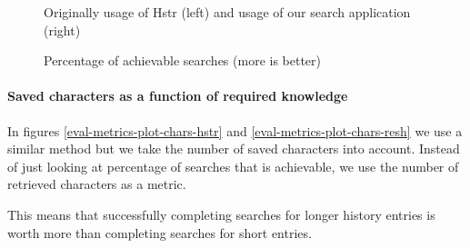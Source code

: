 \begin{figure}
\centering
{}\hfill
{}
\caption{Percentage of achievable searches (more is better)}
\small{Originally usage of Hstr (left) and usage of our search application (right)}
\label{eval-metrics-plot-cmds}
\end{figure}


\paragraph{Saved characters as a function of required knowledge}

In figures \ref{eval-metrics-plot-chars-hstr} and \ref{eval-metrics-plot-chars-resh} we use a similar method but we take the number of saved characters into account. Instead of just looking at percentage of searches that is achievable, we use the number of retrieved characters as a metric. 

This means that successfully completing searches for longer history entries is worth more than completing searches for short entries.


